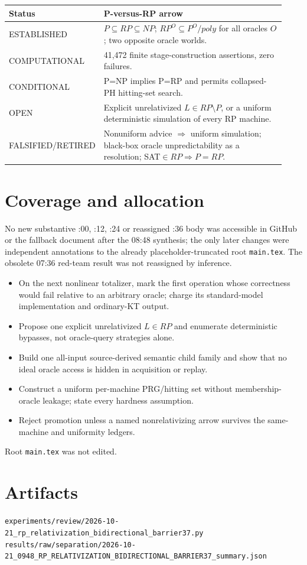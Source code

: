 \documentclass[11pt]{article}
\begin{document}
\medskip
\begin{tabular}{p{0.18\linewidth}p{0.75\linewidth}}
\toprule
Status & P-versus-RP arrow \\
\midrule
ESTABLISHED & $P\subseteq RP\subseteq NP$; $RP^O\subseteq P^O/poly$ for all
oracles $O$; two opposite oracle worlds. \\
COMPUTATIONAL & 41,472 finite stage-construction assertions, zero failures. \\
CONDITIONAL & P=NP implies P=RP and permits collapsed-PH hitting-set search. \\
OPEN & Explicit unrelativized $L\in RP\setminus P$, or a uniform deterministic
simulation of every RP machine. \\
FALSIFIED/RETIRED & Nonuniform advice $\Rightarrow$ uniform simulation;
black-box oracle unpredictability as a resolution; SAT$\in RP\Rightarrow P=RP$.
\\
\bottomrule
\end{tabular}

\section*{Coverage and allocation}
No new substantive :00, :12, :24 or reassigned :36 body was accessible in
GitHub or the fallback document after the 08:48 synthesis; the only later
changes were independent annotations to the already placeholder-truncated root
\texttt{main.tex}.  The obsolete 07:36 red-team result was not reassigned by
inference.

\begin{itemize}
\item[:00 MCSP.] On the next nonlinear totalizer, mark the first operation
whose correctness would fail relative to an arbitrary oracle; charge its
standard-model implementation and ordinary-KT output.
\item[:12 RP separation.] Propose one explicit unrelativized $L\in RP$ and
enumerate deterministic bypasses, not oracle-query strategies alone.
\item[:24 ARC.] Build one all-input source-derived semantic child family and
show that no ideal oracle access is hidden in acquisition or replay.
\item[:36 RP derandomization.] Construct a uniform per-machine PRG/hitting set
without membership-oracle leakage; state every hardness assumption.
\item[:48 synthesis.] Reject promotion unless a named nonrelativizing arrow
survives the same-machine and uniformity ledgers.
\end{itemize}

Root \texttt{main.tex} was not edited.

\section*{Artifacts}
\nolinkurl{experiments/review/2026-10-21_rp_relativization_bidirectional_barrier37.py}
\newline
\nolinkurl{results/raw/separation/2026-10-21_0948_RP_RELATIVIZATION_BIDIRECTIONAL_BARRIER37_summary.json}

\end{document}
